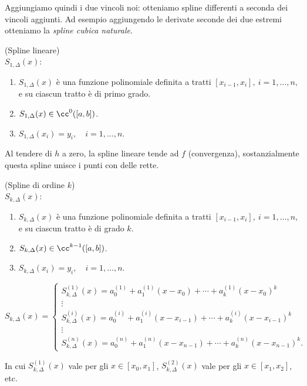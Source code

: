 Aggiungiamo quindi i due vincoli noi: otteniamo spline differenti a seconda 
dei vincoli aggiunti. Ad esempio aggiungendo le derivate seconde dei due
estremi otteniamo la \emph{spline cubica naturale}.

\begin{defi}
(Spline lineare)\\
$S_{1,\Delta}(x)$:
\begin{enumerate}
\item $S_{1,\Delta}(x)$ è una funzione polinomiale definita a tratti
$[x_{i-1}, x_i], \ i = 1, \ldots, n,$ e su ciascun tratto è di primo grado.
\item $S_{1,\Delta}(x) \in \cc^0([a,b])$.
\item $S_{1,\Delta}(x_i) = y_i, \quad i = 1, \ldots, n$.
\end{enumerate}
\end{defi}

Al tendere di $h$ a zero, la spline lineare tende ad $f$ (convergenza),
sostanzialmente questa spline unisce i punti con delle rette.

\begin{defi}
(Spline di ordine $k$)\\
$S_{k,\Delta}(x)$:
\begin{enumerate}
\item $S_{k,\Delta}(x)$ è una funzione polinomiale definita a tratti
$[x_{i-1}, x_i], \ i = 1, \ldots, n,$ e su ciascun tratto è di grado $k$.
\item $S_{k,\Delta}(x) \in \cc^{k-1}([a,b])$.
\item $S_{k,\Delta}(x_i) = y_i, \quad i = 1, \ldots, n$.
\end{enumerate}
\[
S_{k,\Delta}(x) = \left \{
\begin{array}{l}
S_{k,\Delta}^{(1)}(x) = a_0^{(1)} + a_1^{(1)}(x-x_0)+ \cdots + a_k^{(1)}(x-x_0)^k \\
\vdots \\
S_{k,\Delta}^{(i)}(x) = a_0^{(i)} + a_1^{(i)}(x-x_{i-1}) + \cdots + 
a_k^{(i)}(x-x_{i-1})^k \\
\vdots \\
S_{k,\Delta}^{(n)}(x) =  a_0^{(n)} + a_1^{(n)}(x-x_{n-1}) + \cdots 
+a_k^{(n)}(x-x_{n-1})^k.
\end{array}\right.
\]
\begin{notabene}
In cui $S_{k,\Delta}^{(1)}(x)$ vale per gli $x \in [x_0, x_1]$, 
$S_{k,\Delta}^{(2)}(x)$  vale per gli $x \in [x_1, x_2]$, etc.
\end{notabene}
\end{defi}

